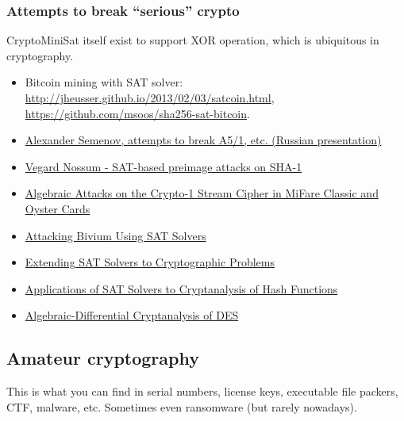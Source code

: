 \subsubsection{Attempts to break ``serious'' crypto}

CryptoMiniSat itself exist to support XOR operation, which is ubiquitous in cryptography.

\begin{itemize}
\item Bitcoin mining with SAT solver: \url{http://jheusser.github.io/2013/02/03/satcoin.html}, \url{https://github.com/msoos/sha256-sat-bitcoin}.

\item \href{http://2015.phdays.ru/program/dev/40400/}{Alexander Semenov, attempts to break A5/1, etc. (Russian presentation)}

\item \href{https://yurichev.com/mirrors/SAT_SMT_crypto/thesis-output.pdf}{Vegard Nossum - SAT-based preimage attacks on SHA-1}

\item \href{https://yurichev.com/mirrors/SAT_SMT_crypto/166.pdf}{Algebraic Attacks on the Crypto-1 Stream Cipher in MiFare Classic and Oyster Cards}

\item \href{https://yurichev.com/mirrors/SAT_SMT_crypto/Attacking-Bivium-Using-SAT-Solvers.pdf}{Attacking Bivium Using SAT Solvers}

\item \href{https://yurichev.com/mirrors/SAT_SMT_crypto/Extending_SAT_2009.pdf}{Extending SAT Solvers to Cryptographic Problems}

\item \href{https://yurichev.com/mirrors/SAT_SMT_crypto/sat-hash.pdf}{Applications of SAT Solvers to Cryptanalysis of Hash Functions}

\item \href{https://yurichev.com/mirrors/SAT_SMT_crypto/slidesC2DES.pdf}{Algebraic-Differential Cryptanalysis of DES}

\end{itemize}

\subsection{Amateur cryptography}

This is what you can find in serial numbers, license keys, executable file packers, CTF, malware, etc.
Sometimes even ransomware (but rarely nowadays).

